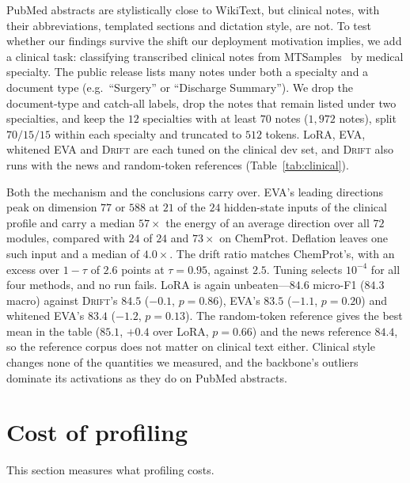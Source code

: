 \documentclass[conference,onecolumn]{IEEEtran}
\newcommand{\method}{\textsc{Drift}}
\begin{document}

PubMed abstracts are stylistically close to WikiText, but clinical notes, with
their abbreviations, templated sections and dictation style, are not. To test
whether our findings survive the shift our deployment motivation implies, we add
a clinical task: classifying transcribed clinical notes from
MTSamples~\cite{mtsamples} by medical specialty. The public release lists many
notes under both a specialty and a document type (e.g.\ ``Surgery'' or
``Discharge Summary''). We drop the document-type and catch-all labels, drop the
notes that remain listed under two specialties, and keep the $12$ specialties
with at least $70$ notes ($1{,}972$ notes), split $70/15/15$ within each
specialty and truncated to $512$ tokens. LoRA, EVA, whitened EVA and
\method{} are each tuned on the clinical dev set, and \method{} also runs with
the news and random-token references (Table~\ref{tab:clinical}).

Both the mechanism and the conclusions carry over. EVA's leading directions peak
on dimension $77$ or $588$ at $21$ of the $24$ hidden-state inputs of the
clinical profile and carry a median $57\times$ the energy of an average
direction over all $72$ modules, compared with $24$ of $24$ and $73\times$ on
ChemProt. Deflation
leaves one such input and a median of $4.0\times$. The drift ratio matches
ChemProt's, with an excess over $1-\tau$ of $2.6$ points at $\tau = 0.95$,
against $2.5$. Tuning selects $10^{-4}$ for all four methods, and no run fails.
LoRA is again unbeaten---$84.6$ micro-F1 ($84.3$ macro) against \method{}'s
$84.5$ ($-0.1$, $p = 0.86$), EVA's $83.5$ ($-1.1$, $p = 0.20$) and whitened
EVA's $83.4$ ($-1.2$, $p = 0.13$). The random-token reference gives the best
mean in the table ($85.1$, $+0.4$ over LoRA, $p = 0.66$) and the news reference
$84.4$, so the reference corpus does not matter on clinical text either.
Clinical style changes none of the quantities we measured, and the backbone's
outliers dominate its activations as they do on PubMed abstracts.

\section{Cost of profiling}
\label{sup:cost}
This section measures what profiling costs.
\end{document}
